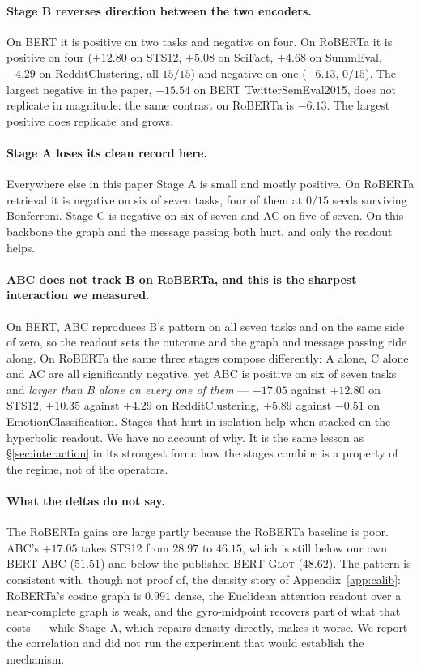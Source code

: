 \documentclass{article}
\begin{document}
\paragraph{Stage B reverses direction between the two encoders.} On BERT it is
positive on two tasks and negative on four. On RoBERTa it is positive on four
($+12.80$ on STS12, $+5.08$ on SciFact, $+4.68$ on SummEval, $+4.29$ on
RedditClustering, all $15/15$) and negative on one ($-6.13$, $0/15$). The
largest negative in the paper, $-15.54$ on BERT TwitterSemEval2015, does not
replicate in magnitude: the same contrast on RoBERTa is $-6.13$. The largest
positive does replicate and grows.

\paragraph{Stage A loses its clean record here.} Everywhere else in this paper
Stage A is small and mostly positive. On RoBERTa retrieval it is negative on six
of seven tasks, four of them at $0/15$ seeds surviving Bonferroni. Stage C is
negative on six of seven and AC on five of seven. On this backbone the graph and
the message passing both hurt, and only the readout helps.

\paragraph{ABC does not track B on RoBERTa, and this is the sharpest
interaction we measured.} On BERT, ABC reproduces B's pattern on all seven tasks
and on the same side of zero, so the readout sets the outcome and the graph and
message passing ride along. On RoBERTa the same three stages compose
differently: A alone, C alone and AC are all significantly negative, yet ABC is
positive on six of seven tasks and \emph{larger than B alone on every one of
them} --- $+17.05$ against $+12.80$ on STS12, $+10.35$ against $+4.29$ on
RedditClustering, $+5.89$ against $-0.51$ on EmotionClassification. Stages that
hurt in isolation help when stacked on the hyperbolic readout. We have no
account of why. It is the same lesson as \S\ref{sec:interaction} in its
strongest form: how the stages combine is a property of the regime, not of the
operators.

\paragraph{What the deltas do not say.} The RoBERTa gains are large partly
because the RoBERTa baseline is poor. ABC's $+17.05$ takes STS12 from $28.97$ to
$46.15$, which is still below our own BERT ABC ($51.51$) and below the published
BERT \textsc{Glot} ($48.62$). The pattern is consistent with, though not proof
of, the density story of Appendix~\ref{app:calib}: RoBERTa's cosine graph is
$0.991$ dense, the Euclidean attention readout over a near-complete graph is
weak, and the gyro-midpoint recovers part of what that costs --- while Stage A,
which repairs density directly, makes it worse. We report the correlation and
did not run the experiment that would establish the mechanism.
\end{document}
